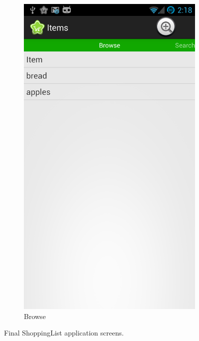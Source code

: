 \documentclass[journal]{IEEEtran}
\begin{document}
\begin{figure}[h!]
    ~ %
    \begin{subfigure}[b]{0.1\textwidth}
        \centering
        \includegraphics[width=\textwidth]{images/s3.png}
        \caption{Browse}
        \label{fig:browse}
    \end{subfigure}
    \caption{Final ShoppingList application screens.}\label{fig:shoppinglist}
\end{figure}
\end{document}
